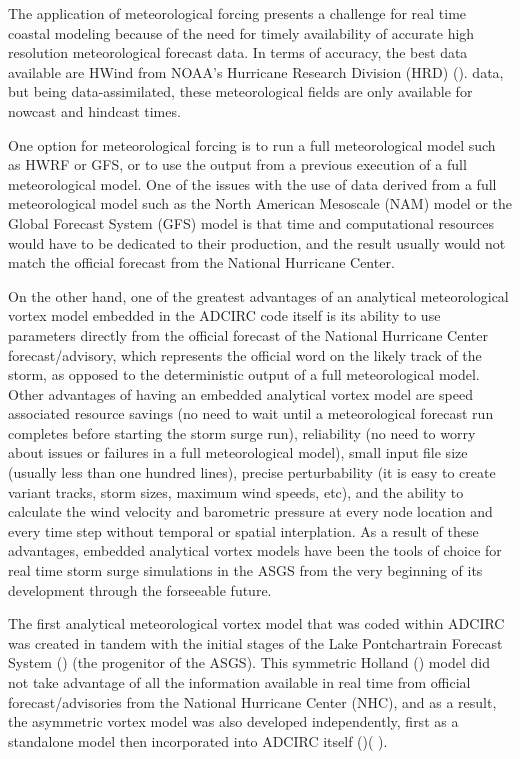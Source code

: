 \documentclass[jmse,article,submit,moreauthors,pdftex,12pt,a4paper]{mdpi}
\begin{document}
The application of meteorological forcing presents a challenge for 
real time coastal modeling because of the need for timely 
availability of accurate high resolution meteorological forecast 
data. In terms of accuracy, the best data available are HWind from 
NOAA's Hurricane Research Division (HRD) (\cite{PowellMD1998}). 
data, but being data-assimilated, these meteorological fields are 
only available for nowcast and hindcast times.

One option for meteorological forcing is to run a full 
meteorological model such as HWRF or GFS, or to use the output from 
a previous execution of a full meteorological model. One of the 
issues with the use of data derived from a full meteorological model 
such as the North American Mesoscale (NAM) model or the Global 
Forecast System (GFS) model is that time and computational resources 
would have to be dedicated to their production, and the result 
usually would not match the official forecast from the National 
Hurricane Center. 

On the other hand, one of the greatest advantages of an analytical 
meteorological vortex model embedded in the ADCIRC code itself is 
its ability to use parameters directly from the official forecast of 
the National Hurricane Center forecast/advisory, which represents 
the official word on the likely track of the storm, as opposed to 
the deterministic output of a full meteorological model. Other 
advantages of having an embedded analytical vortex model are speed 
associated resource savings (no need to wait until a meteorological 
forecast run completes before starting the storm surge run), 
reliability (no need to worry about issues or failures in a full 
meteorological model), small input file size (usually less than one 
hundred lines), precise perturbability (it is easy to create variant 
tracks, storm sizes, maximum wind speeds, etc), and the ability to 
calculate the wind velocity and barometric pressure at every node 
location and every time step without temporal or spatial 
interplation. As a result of these advantages, embedded analytical 
vortex models have been the tools of choice for real time storm 
surge simulations in the ASGS from the very beginning of its 
development through the forseeable future.  

The first analytical meteorological vortex model that was coded 
within ADCIRC was created in tandem with the initial stages of the 
Lake Pontchartrain Forecast System (\cite{FlemingJG2008}) (the 
progenitor of the ASGS). This symmetric Holland (\cite 
{HollandGJ1980}) model did not take advantage of all the information 
available in real time from official forecast/advisories from the 
National Hurricane Center (NHC), and as a result, the asymmetric 
vortex model was also developed independently, first as a standalone 
model then incorporated into ADCIRC itself (\cite{MattocksC2006})(
\cite{MattocksC2008}). 
\end{document}

